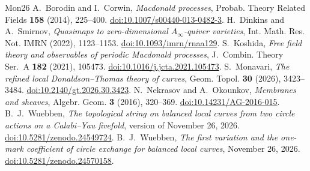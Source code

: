 \begin{thebibliography}{Mon26}
 A.~Borodin and I.~Corwin, \emph{Macdonald processes}, Probab. Theory Related Fields \textbf{158} (2014), 225--400. \href{https://doi.org/10.1007/s00440-013-0482-3}{doi:10.1007/s00440-013-0482-3}.
 H.~Dinkins and A.~Smirnov, \emph{Quasimaps to zero-dimensional $A_\infty$-quiver varieties}, Int. Math. Res. Not. IMRN (2022), 1123--1153. \href{https://doi.org/10.1093/imrn/rnaa129}{doi:10.1093/imrn/rnaa129}.
 S.~Koshida, \emph{Free field theory and observables of periodic Macdonald processes}, J.~Combin. Theory Ser.~A \textbf{182} (2021), 105473. \href{https://doi.org/10.1016/j.jcta.2021.105473}{doi:10.1016/j.jcta.2021.105473}.
 S.~Monavari, \emph{The refined local Donaldson--Thomas theory of curves}, Geom. Topol. \textbf{30} (2026), 3423--3484. \href{https://doi.org/10.2140/gt.2026.30.3423}{doi:10.2140/gt.2026.30.3423}.
 N.~Nekrasov and A.~Okounkov, \emph{Membranes and sheaves}, Algebr. Geom. \textbf{3} (2016), 320--369. \href{https://doi.org/10.14231/AG-2016-015}{doi:10.14231/AG-2016-015}.
 B.~J.~Wuebben, \emph{The topological string on balanced local curves from two circle actions on a Calabi--Yau fivefold}, version of November 26, 2026. \href{https://doi.org/10.5281/zenodo.24549724}{doi:10.5281/zenodo.24549724}.
 B.~J.~Wuebben, \emph{The first variation and the one-mark coefficient of circle exchange for balanced local curves}, November 26, 2026. \href{https://doi.org/10.5281/zenodo.24570158}{doi:10.5281/zenodo.24570158}.
\end{thebibliography}
